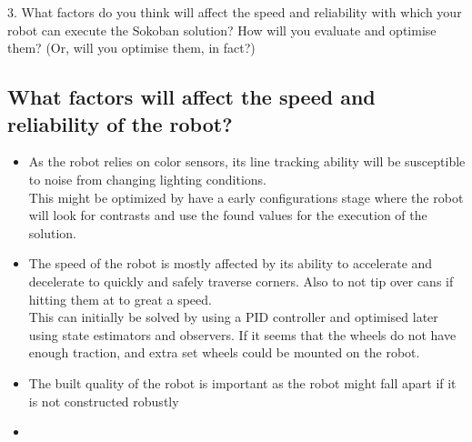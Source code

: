 \documentclass[../../main.tex]{subfiles}
\begin{document}
3.  What factors do you think will affect the speed and reliability with which your robot can execute the Sokoban solution?  How will you evaluate and optimise them? (Or, will you optimise them, in fact?)
	
\subsection{What factors will affect the speed and reliability of the robot?}%
\label{sub:what_factors_will_affect_the_speed_and_reliability_of_the_robot_}

\begin{itemize}
	\item As the robot relies on color sensors, its line tracking ability will be susceptible to
		noise from changing lighting conditions.\\
		This might be optimized by have a early configurations stage where the robot will look for
		contrasts and use the found values for the execution of the solution.
	\item The speed of the robot is mostly affected by its ability to accelerate and decelerate to
		quickly and safely traverse corners. Also to not tip over cans if hitting them at to great a
		speed.\\
		This can initially be solved by using a PID controller and optimised later using state estimators
		and observers. If it seems that the wheels do not have enough traction, and extra set wheels
		could be mounted on the robot.
	\item The built quality of the robot is important as the robot might fall apart if it is not
		constructed robustly
	\item 
\end{itemize}
\end{document}
